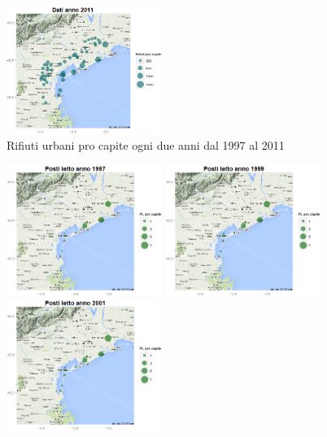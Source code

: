 \documentclass[a4paper,11pt,twoside,openright]{book}							%
\begin{document}
\begin{figure}[H]
	\includegraphics[trim=0cm 0cm 0cm 0cm,clip=true,width=0.45\textwidth]{Immagini/venezia_dati/Dati2011.png}
	\caption{Rifiuti urbani pro capite ogni due anni dal 1997 al 2011}
	\label{fig:Ven_bubbledati}
\end{figure}
\newpage
\begin{figure}[H]
	\centering
	\includegraphics[trim=0cm 0cm 0cm 0cm,clip=true,width=0.45\textwidth]{Immagini/venezia_dati/PL1997.png}
	\includegraphics[trim=0cm 0cm 0cm 0cm,clip=true,width=0.45\textwidth]{Immagini/venezia_dati/PL1999.png}
	\includegraphics[trim=0cm 0cm 0cm 0cm,clip=true,width=0.45\textwidth]{Immagini/venezia_dati/PL2001.png}

\end{figure}
\end{document}
